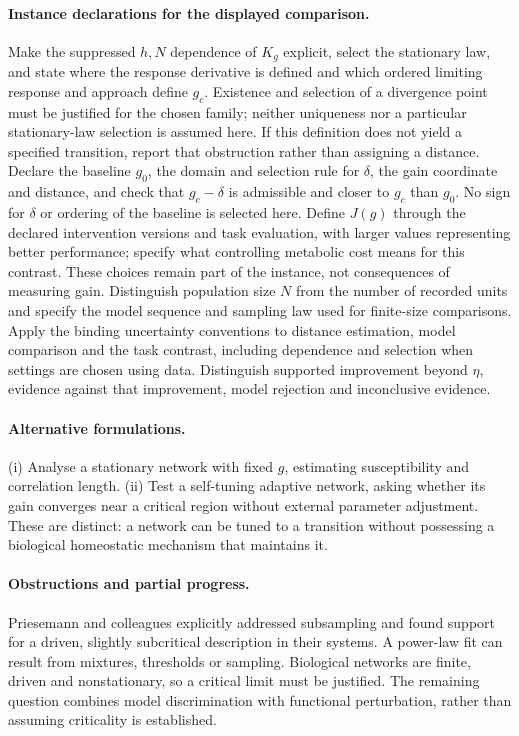 \documentclass[11pt]{article}
\begin{document}
\paragraph{Instance declarations for the displayed comparison.} Make the suppressed $h,N$ dependence of $K_g$ explicit, select the stationary law, and state where the response derivative is defined and which ordered limiting response and approach define $g_c$. Existence and selection of a divergence point must be justified for the chosen family; neither uniqueness nor a particular stationary-law selection is assumed here. If this definition does not yield a specified transition, report that obstruction rather than assigning a distance. Declare the baseline $g_0$, the domain and selection rule for $\delta$, the gain coordinate and distance, and check that $g_c-\delta$ is admissible and closer to $g_c$ than $g_0$. No sign for $\delta$ or ordering of the baseline is selected here. Define $J(g)$ through the declared intervention versions and task evaluation, with larger values representing better performance; specify what controlling metabolic cost means for this contrast. These choices remain part of the instance, not consequences of measuring gain. Distinguish population size $N$ from the number of recorded units and specify the model sequence and sampling law used for finite-size comparisons. Apply the binding uncertainty conventions to distance estimation, model comparison and the task contrast, including dependence and selection when settings are chosen using data. Distinguish supported improvement beyond $\eta$, evidence against that improvement, model rejection and inconclusive evidence.

\paragraph{Alternative formulations.} (i) Analyse a stationary network with fixed $g$, estimating susceptibility and correlation length. (ii) Test a self-tuning adaptive network, asking whether its gain converges near a critical region without external parameter adjustment. These are distinct: a network can be tuned to a transition without possessing a biological homeostatic mechanism that maintains it.
\paragraph{Obstructions and partial progress.} Priesemann and colleagues explicitly addressed subsampling and found support for a driven, slightly subcritical description in their systems. A power-law fit can result from mixtures, thresholds or sampling. Biological networks are finite, driven and nonstationary, so a critical limit must be justified. The remaining question combines model discrimination with functional perturbation, rather than assuming criticality is established.
\end{document}
